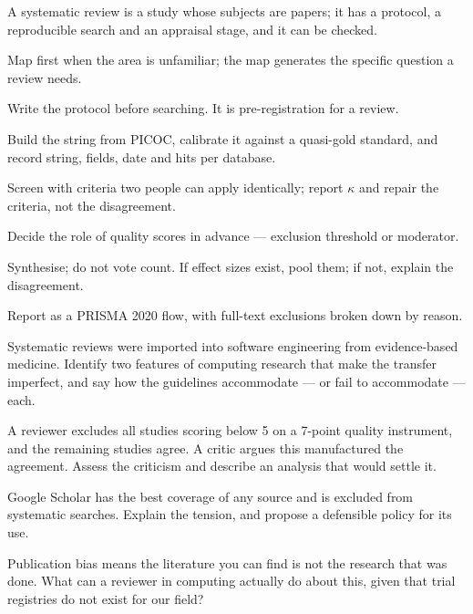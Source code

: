 \begin{chaptersummary}
\begin{tight}
  \item A systematic review is a study whose subjects are papers; it has a
    protocol, a reproducible search and an appraisal stage, and it can be
    checked.
  \item Map first when the area is unfamiliar; the map generates the specific
    question a review needs.
  \item Write the protocol before searching. It is pre-registration for a
    review.
  \item Build the string from PICOC, calibrate it against a quasi-gold
    standard, and record string, fields, date and hits per database.
  \item Screen with criteria two people can apply identically; report $\kappa$
    and repair the criteria, not the disagreement.
  \item Decide the role of quality scores in advance --- exclusion threshold or
    moderator.
  \item Synthesise; do not vote count. If effect sizes exist, pool them; if not,
    explain the disagreement.
  \item Report as a PRISMA 2020 flow, with full-text exclusions broken down by
    reason.
\end{tight}
\end{chaptersummary}

\begin{reviewq}
  \item Systematic reviews were imported into software engineering from
    evidence-based medicine. Identify two features of computing research that
    make the transfer imperfect, and say how the guidelines accommodate --- or
    fail to accommodate --- each.
  \item A reviewer excludes all studies scoring below 5 on a 7-point quality
    instrument, and the remaining studies agree. A critic argues this
    manufactured the agreement. Assess the criticism and describe an analysis
    that would settle it.
  \item Google Scholar has the best coverage of any source and is excluded from
    systematic searches. Explain the tension, and propose a defensible policy
    for its use.
  \item Publication bias means the literature you can find is not the research
    that was done. What can a reviewer in computing actually do about this,
    given that trial registries do not exist for our field?
\end{reviewq}
